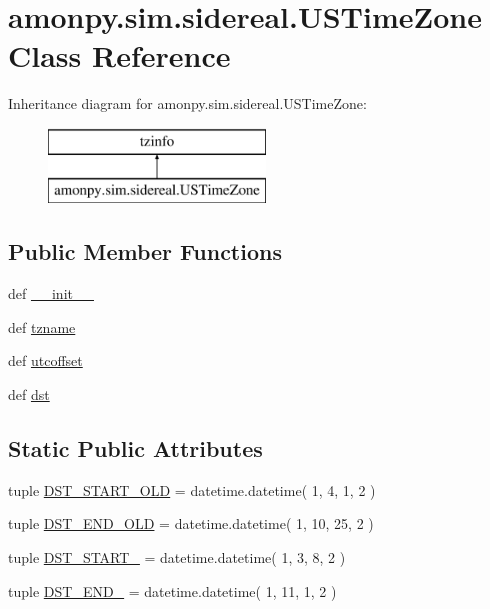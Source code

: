 \hypertarget{classamonpy_1_1sim_1_1sidereal_1_1_u_s_time_zone}{\section{amonpy.\-sim.\-sidereal.\-U\-S\-Time\-Zone Class Reference}
\label{classamonpy_1_1sim_1_1sidereal_1_1_u_s_time_zone}
}
Inheritance diagram for amonpy.\-sim.\-sidereal.\-U\-S\-Time\-Zone\-:\begin{figure}[H]
\begin{center}
\leavevmode
\includegraphics[height=2.000000cm]{classamonpy_1_1sim_1_1sidereal_1_1_u_s_time_zone}
\end{center}
\end{figure}
\subsection*{Public Member Functions}
\begin{DoxyCompactItemize}
\item 
def \hyperlink{classamonpy_1_1sim_1_1sidereal_1_1_u_s_time_zone_ab601802cc6ed96e739dcadd996d9587a}{\-\_\-\-\_\-init\-\_\-\-\_\-}
\item 
def \hyperlink{classamonpy_1_1sim_1_1sidereal_1_1_u_s_time_zone_a0ec12f482689f531ca39f9af8af0182c}{tzname}
\item 
def \hyperlink{classamonpy_1_1sim_1_1sidereal_1_1_u_s_time_zone_ad34a3532bf51a65d154dd7e288059ebc}{utcoffset}
\item 
def \hyperlink{classamonpy_1_1sim_1_1sidereal_1_1_u_s_time_zone_a54135cabb3cc06777a94e5912b4ff29e}{dst}
\end{DoxyCompactItemize}
\subsection*{Static Public Attributes}
\begin{DoxyCompactItemize}
\item 
tuple \hyperlink{classamonpy_1_1sim_1_1sidereal_1_1_u_s_time_zone_afea8d961d34e0b6a75bdad0f9ac41b34}{D\-S\-T\-\_\-\-S\-T\-A\-R\-T\-\_\-\-O\-L\-D} = datetime.\-datetime( 1, 4, 1, 2 )
\item 
tuple \hyperlink{classamonpy_1_1sim_1_1sidereal_1_1_u_s_time_zone_a4bb27c0cb6a5aefb11ed8c9ef9f4a5ea}{D\-S\-T\-\_\-\-E\-N\-D\-\_\-\-O\-L\-D} = datetime.\-datetime( 1, 10, 25, 2 )
\item 
tuple \hyperlink{classamonpy_1_1sim_1_1sidereal_1_1_u_s_time_zone_aa40ce77d299e1e3539f146b415383614}{D\-S\-T\-\_\-\-S\-T\-A\-R\-T\-\_} = datetime.\-datetime( 1, 3, 8, 2 )
\item 
tuple \hyperlink{classamonpy_1_1sim_1_1sidereal_1_1_u_s_time_zone_a96f5f104143b5b371c91ffbb4c01e1bd}{D\-S\-T\-\_\-\-E\-N\-D\-\_} = datetime.\-datetime( 1, 11, 1, 2 )
\end{DoxyCompactItemize}



